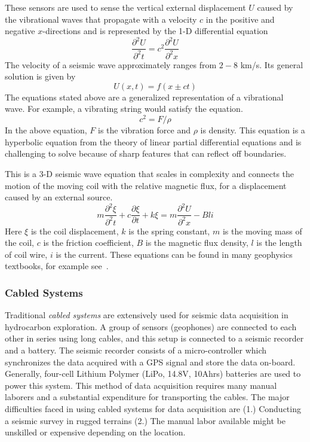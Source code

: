These sensors are used to sense the vertical external displacement $U$ caused by the vibrational waves that propagate with a velocity $c$ in the positive and negative $x$-directions and is represented by the 1-D differential  equation
\begin{equation}
\frac{\partial^{2}{U}}{\partial^{2}{t}} = {c}^{2}\frac{\partial^{2}{U}}{\partial^{2}{x}}
\end{equation}
The velocity of a seismic wave approximately ranges from $2-8$ km/s.
Its general solution is given by
\begin{equation}
U(x,t) = f(x \pm ct)
\end{equation}
The equations stated above are a generalized representation of a vibrational wave. For example, a vibrating string would satisfy the equation. 
\begin{equation}
{c}^{2} = F/\rho
\end{equation}
In the above equation, $F$ is the vibration force and $\rho$ is density.
This equation is a hyperbolic equation from the theory of linear partial differential equations and is challenging to solve because of sharp features that can reflect off boundaries.

 This is a $3$-D seismic wave equation that scales in complexity and connects the motion of the moving coil with the relative magnetic flux, for a displacement caused by an external source.
\begin{equation}
m\frac{\partial^{2}{\xi}}{\partial^{2}{t}}+c\frac{\partial{\xi}}{\partial{t}}+k\xi = m\frac{\partial^{2}{U}}{\partial^{2}{x}}-Bli
\end{equation} 
Here $\xi$ is the coil displacement, $k$ is the spring constant, $m$ is the moving mass of the coil, $c$ is the friction coefficient, $B$ is the magnetic flux density, $l$ is the length of coil wire, $i$ is the current. These equations can be found in many geophysics textbooks, for example see~\cite{shearer2009introduction}.
\subsubsection{Cabled Systems}
 Traditional \emph{cabled systems} are extensively used for seismic data acquisition in hydrocarbon exploration. A group of sensors (geophones) are connected to each other in series using long cables, and this setup is connected to a seismic recorder and a battery. The seismic recorder consists of a micro-controller which synchronizes the data acquired with a GPS signal and store the data on-board. Generally, four-cell Lithium Polymer (LiPo, 14.8V, 10Ahrs) batteries are used to power this system. This method of data acquisition requires many manual laborers and a substantial expenditure for transporting the cables. The major difficulties faced in using cabled systems for data acquisition are (1.) Conducting a seismic survey in rugged terrains (2.) The manual labor available might be unskilled or expensive depending on the location.  

